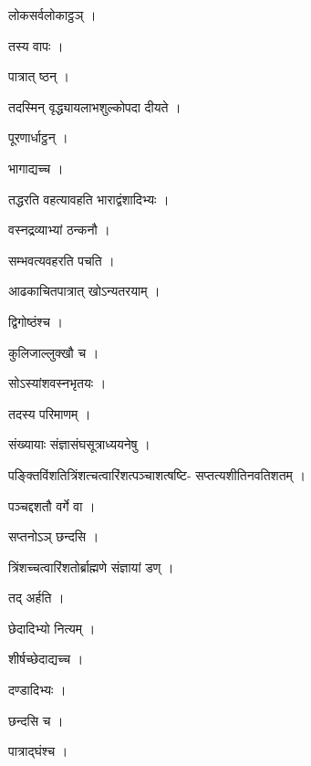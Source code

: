 \documentclass[10pt, openany]{book}
\begin{document}
\noindent लोकसर्वलोकाट्ठञ् ।

\noindent तस्य वापः ।

\noindent पात्रात् ष्ठन् ।

\noindent तदस्मिन् वृद्ध्यायलाभशुल्कोपदा दीयते ।

\noindent पूरणार्धाट्ठन् ।

\noindent भागाद्यच्च ।

\noindent तद्धरति वहत्यावहति भाराद्वंशादिभ्यः ।

\noindent वस्नद्रव्याभ्यां ठन्कनौ ।

\noindent सम्भवत्यवहरति पचति ।

\noindent आढकाचितपात्रात् खोऽन्यतरयाम् ।

\noindent द्विगोष्ठंश्च ।

\noindent कुलिजाल्लुक्खौ च ।

\noindent सोऽस्यांशवस्नभृतयः ।

\noindent तदस्य परिमाणम् ।

\noindent संख्यायाः संज्ञासंघसूत्राध्ययनेषु ।

\noindent पङ्क्तिविंशतित्रिंशत्चत्वारिंशत्पञ्चाशत्षष्टि- सप्तत्यशीतिनवतिशतम् ।

\noindent पञ्चद्दशतौ वर्गे वा ।

\noindent सप्तनोऽञ् छन्दसि ।

\noindent त्रिंशच्चत्वारिंशतोर्ब्राह्मणे संज्ञायां डण् ।

\noindent तद् अर्हति ।

\noindent छेदादिभ्यो नित्यम् ।

\noindent शीर्षच्छेदाद्यच्च ।

\noindent दण्डादिभ्यः ।

\noindent छन्दसि च ।

\noindent पात्राद्घंश्च ।
\end{document}
